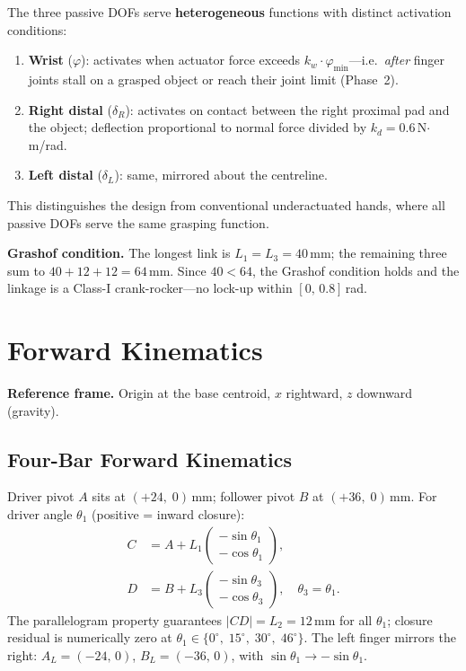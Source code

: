 \documentclass[10pt,twocolumn]{article}
\begin{document}
The three passive DOFs serve \textbf{heterogeneous} functions with distinct activation conditions:
\begin{enumerate}[leftmargin=*, itemsep=2pt, topsep=2pt]
  \item \textbf{Wrist} ($\varphi$): activates when actuator force exceeds $k_w \cdot \varphi_\text{min}$---i.e.\ \emph{after} finger joints stall on a grasped object or reach their joint limit (Phase~2).
  \item \textbf{Right distal} ($\delta_R$): activates on contact between the right proximal pad and the object; deflection proportional to normal force divided by $k_d = 0.6$\,N$\cdot$m/rad.
  \item \textbf{Left distal} ($\delta_L$): same, mirrored about the centreline.
\end{enumerate}
This distinguishes the design from conventional underactuated hands, where all passive DOFs serve the same grasping function.

\textbf{Grashof condition.} The longest link is $L_1 = L_3 = 40$\,mm; the remaining three sum to $40 + 12 + 12 = 64$\,mm. Since $40 < 64$, the Grashof condition holds and the linkage is a Class-I crank-rocker---no lock-up within $[0,\,0.8]$\,rad.

\section{Forward Kinematics}
\label{sec:fk}

\noindent\textbf{Reference frame.}
Origin at the base centroid, $x$ rightward, $z$ downward (gravity).

\subsection{Four-Bar Forward Kinematics}
Driver pivot $A$ sits at $(+24,\;0)$\,mm; follower pivot $B$ at $(+36,\;0)$\,mm. For driver angle $\theta_1$ (positive = inward closure):
\begin{align}
  C &= A + L_1 \begin{pmatrix} -\sin\theta_1 \\ -\cos\theta_1 \end{pmatrix},
  \label{eq:fk_C}\\[4pt]
  D &= B + L_3 \begin{pmatrix} -\sin\theta_3 \\ -\cos\theta_3 \end{pmatrix},
  \quad \theta_3 = \theta_1.
  \label{eq:fk_D}
\end{align}
The parallelogram property guarantees $|CD| = L_2 = 12$\,mm for all $\theta_1$; closure residual is numerically zero at $\theta_1 \in \{0^\circ,\;15^\circ,\;30^\circ,\;46^\circ\}$. The left finger mirrors the right: $A_L=(-24,\,0)$, $B_L=(-36,\,0)$, with $\sin\theta_1 \to -\sin\theta_1$.
\end{document}
